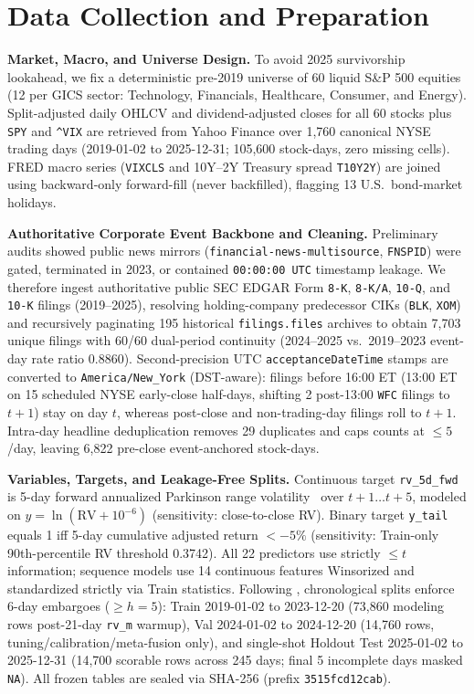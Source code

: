 \documentclass[11pt,a4paper]{article}
\begin{document}
\section{Data Collection and Preparation}

\textbf{Market, Macro, and Universe Design.} To avoid 2025 survivorship
lookahead, we fix a deterministic pre-2019 universe of 60 liquid
S\&P 500 equities (12 per GICS sector: Technology, Financials, Healthcare,
Consumer, and Energy). Split-adjusted daily OHLCV and dividend-adjusted closes
for all 60 stocks plus \texttt{SPY} and \texttt{\^{}VIX} are
retrieved from Yahoo Finance over 1,760 canonical NYSE trading days
(2019-01-02 to 2025-12-31; 105,600 stock-days, zero missing cells).
FRED macro series (\texttt{VIXCLS} and 10Y--2Y Treasury spread
\texttt{T10Y2Y}) are joined using backward-only forward-fill (never
backfilled), flagging 13 U.S.\ bond-market holidays.

\textbf{Authoritative Corporate Event Backbone and Cleaning.} Preliminary
audits showed public news mirrors (\texttt{financial-news-multisource},
\texttt{FNSPID}) were gated, terminated in 2023, or contained
\texttt{00:00:00 UTC} timestamp leakage. We therefore ingest authoritative
public SEC EDGAR Form \texttt{8-K}, \texttt{8-K/A}, \texttt{10-Q}, and
\texttt{10-K} filings (2019--2025), resolving holding-company predecessor
CIKs (\texttt{BLK}, \texttt{XOM}) and recursively paginating
195 historical \texttt{filings.files} archives to obtain
7,703 unique filings with 60/60 dual-period continuity
(2024--2025 vs.\ 2019--2023 event-day rate ratio 0.8860).
Second-precision UTC \texttt{acceptanceDateTime} stamps are converted to
\texttt{America/New\_York} (DST-aware): filings before 16:00 ET (13:00 ET on
15 scheduled NYSE early-close half-days, shifting 2
post-13:00 \texttt{WFC} filings to $t+1$) stay on day $t$, whereas post-close
and non-trading-day filings roll to $t+1$. Intra-day headline deduplication
removes 29 duplicates and caps counts at $\le 5$/day, leaving
6,822 pre-close event-anchored stock-days.

\textbf{Variables, Targets, and Leakage-Free Splits.} Continuous target
\texttt{rv\_5d\_fwd} is 5-day forward annualized Parkinson range
volatility~\cite{parkinson1980} over $t+1\dots t+5$, modeled on
$y=\ln(\text{RV}+10^{-6})$ (sensitivity: close-to-close RV). Binary target
\texttt{y\_tail} equals 1 iff 5-day cumulative adjusted return $< -5\%$
(sensitivity: Train-only 90th-percentile RV threshold 0.3742). All
22 predictors use strictly $\le t$ information; sequence models use 14
continuous features Winsorized and standardized strictly via Train statistics.
Following \citet{lopezdeprado2018}, chronological splits enforce 6-day
embargoes ($\ge h=5$): Train 2019-01-02 to 2023-12-20 (73,860
modeling rows post-21-day \texttt{rv\_m} warmup), Val 2024-01-02 to
2024-12-20 (14,760 rows, tuning/calibration/meta-fusion only), and
single-shot Holdout Test 2025-01-02 to 2025-12-31 (14,700
scorable rows across 245 days; final 5 incomplete days masked
\texttt{NA}). All frozen tables are sealed via SHA-256 (prefix
\texttt{3515fcd12cab}).
\end{document}

